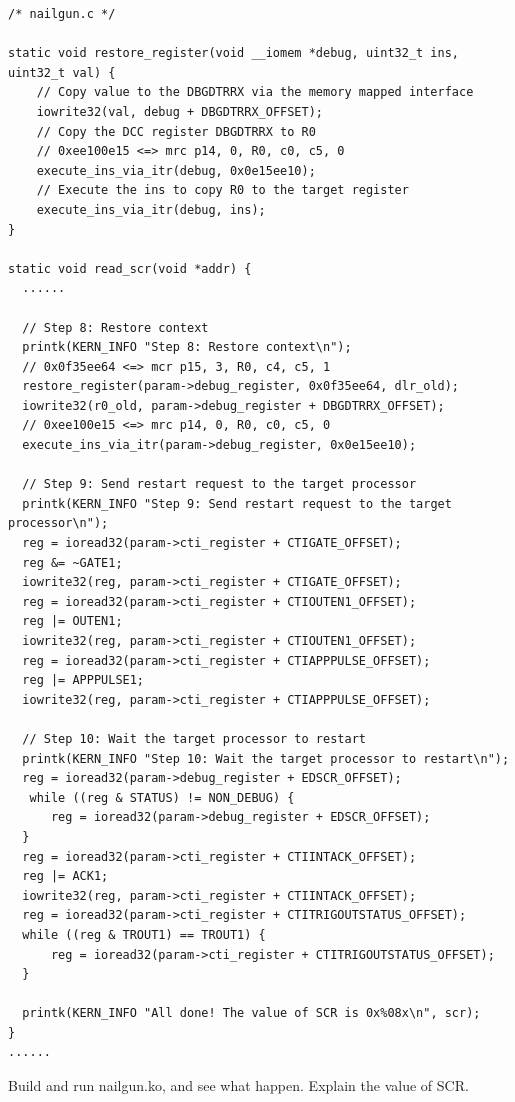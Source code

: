 \begin{lstlisting}
/* nailgun.c */

static void restore_register(void __iomem *debug, uint32_t ins, uint32_t val) {
    // Copy value to the DBGDTRRX via the memory mapped interface
    iowrite32(val, debug + DBGDTRRX_OFFSET);
    // Copy the DCC register DBGDTRRX to R0
    // 0xee100e15 <=> mrc p14, 0, R0, c0, c5, 0
    execute_ins_via_itr(debug, 0x0e15ee10);
    // Execute the ins to copy R0 to the target register
    execute_ins_via_itr(debug, ins);
}

static void read_scr(void *addr) {
  ......

  // Step 8: Restore context
  printk(KERN_INFO "Step 8: Restore context\n");
  // 0x0f35ee64 <=> mcr p15, 3, R0, c4, c5, 1
  restore_register(param->debug_register, 0x0f35ee64, dlr_old);
  iowrite32(r0_old, param->debug_register + DBGDTRRX_OFFSET);
  // 0xee100e15 <=> mrc p14, 0, R0, c0, c5, 0
  execute_ins_via_itr(param->debug_register, 0x0e15ee10);

  // Step 9: Send restart request to the target processor
  printk(KERN_INFO "Step 9: Send restart request to the target processor\n");
  reg = ioread32(param->cti_register + CTIGATE_OFFSET);
  reg &= ~GATE1;
  iowrite32(reg, param->cti_register + CTIGATE_OFFSET);
  reg = ioread32(param->cti_register + CTIOUTEN1_OFFSET);
  reg |= OUTEN1;
  iowrite32(reg, param->cti_register + CTIOUTEN1_OFFSET);
  reg = ioread32(param->cti_register + CTIAPPPULSE_OFFSET);
  reg |= APPPULSE1;
  iowrite32(reg, param->cti_register + CTIAPPPULSE_OFFSET);

  // Step 10: Wait the target processor to restart
  printk(KERN_INFO "Step 10: Wait the target processor to restart\n");
  reg = ioread32(param->debug_register + EDSCR_OFFSET);
   while ((reg & STATUS) != NON_DEBUG) {
      reg = ioread32(param->debug_register + EDSCR_OFFSET);
  }
  reg = ioread32(param->cti_register + CTIINTACK_OFFSET);
  reg |= ACK1;
  iowrite32(reg, param->cti_register + CTIINTACK_OFFSET);
  reg = ioread32(param->cti_register + CTITRIGOUTSTATUS_OFFSET);
  while ((reg & TROUT1) == TROUT1) {
      reg = ioread32(param->cti_register + CTITRIGOUTSTATUS_OFFSET);
  }

  printk(KERN_INFO "All done! The value of SCR is 0x%08x\n", scr);
}
......
\end{lstlisting}

Build and run nailgun.ko, and see what happen. Explain the value of SCR. 


